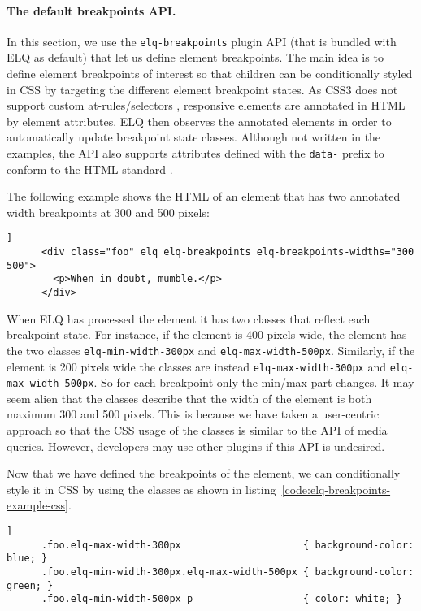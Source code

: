 \documentclass{llncs}
\newcommand{\code}[1]{\texttt{#1}}
\newcommand{\elq}{ELQ}
\begin{document}
  \paragraph{The default breakpoints API.}
    In this section, we use the \code{elq-breakpoints} plugin API (that is bundled with \elq{} as default) that let us define element breakpoints.
    The main idea is to define element breakpoints of interest so that children can be conditionally styled in CSS by targeting the different element breakpoint states.
    As CSS3 does not support custom at-rules/selectors \cite{w3c_css_selectors}, responsive elements are annotated in HTML by element attributes.
    \elq{} then observes the annotated elements in order to automatically update breakpoint state classes.
    Although not written in the examples, the API also supports attributes defined with the \code{data-} prefix to conform to the HTML standard \cite{html-spec}.

    The following example shows the HTML of an element that has two annotated width breakpoints at 300 and 500 pixels:

    \begin{lstlisting}[gobble=6,caption={},captionpos=b,label={}]]
      <div class="foo" elq elq-breakpoints elq-breakpoints-widths="300 500">
        <p>When in doubt, mumble.</p>
      </div>
    \end{lstlisting}

    \noindent
    When \elq{} has processed the element it has two classes that reflect each breakpoint state.
    For instance, if the element is 400 pixels wide, the element has the two classes \code{elq-min-width-300px} and \code{elq-max-width-500px}.
    Similarly, if the element is 200 pixels wide the classes are instead \code{elq-max-width-300px} and \code{elq-max-width-500px}.
    So for each breakpoint only the min/max part changes.
    It may seem alien that the classes describe that the width of the element is both maximum 300 and 500 pixels.
    This is because we have taken a user-centric approach so that the CSS usage of the classes is similar to the API of media queries.
    However, developers may use other plugins if this API is undesired.

    Now that we have defined the breakpoints of the element, we can conditionally style it in CSS by using the classes as shown in listing~\ref{code:elq-breakpoints-example-css}.

    \begin{lstlisting}[gobble=6,caption={Example usage of the breakpoint state classes in CSS.},captionpos=b,label={code:elq-breakpoints-example-css}]]
      .foo.elq-max-width-300px                     { background-color: blue; }
      .foo.elq-min-width-300px.elq-max-width-500px { background-color: green; }
      .foo.elq-min-width-500px p                   { color: white; }
    \end{lstlisting}
\end{document}

